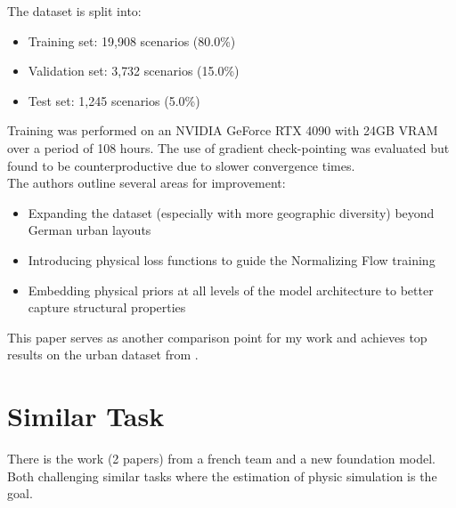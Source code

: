 			The dataset is split into:
			\begin{itemize}[itemsep=1mm, parsep=0pt]
				\item Training set: 19{,}908 scenarios (80.0\%)
				\item Validation set: 3{,}732 scenarios (15.0\%)
				\item Test set: 1{,}245 scenarios (5.0\%)
			\end{itemize}
			Training was performed on an NVIDIA GeForce RTX 4090 with 24GB VRAM over a period of 108 hours. The use of gradient check-pointing was evaluated but found to be counterproductive due to slower convergence times.\\
			The authors outline several areas for improvement:
			\begin{itemize}[itemsep=1mm, parsep=0pt]
				\item Expanding the dataset (especially with more geographic diversity) beyond German urban layouts
				\item Introducing physical loss functions to guide the Normalizing Flow training
				\item Embedding physical priors at all levels of the model architecture to better capture structural properties
			\end{itemize}
			This paper serves as another comparison point for my work and achieves top results on the urban dataset from \cite{spitznagel_urban_2024-1}.
		
		
	\newpage
	\section{Similar Task}
	\label{sec:lit-similar}
		There is the work (2 papers) from a french team and a new foundation model. Both challenging similar tasks where the estimation of physic simulation is the goal.
		
